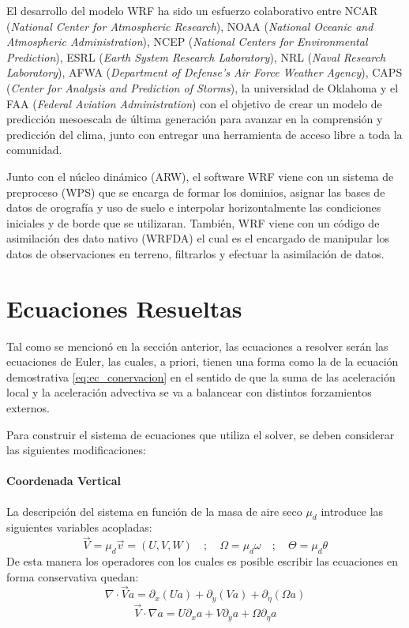 El desarrollo del modelo WRF ha sido un esfuerzo colaborativo entre NCAR (\emph{National Center for Atmospheric Research}), NOAA (\emph{National Oceanic and Atmospheric Administration}), NCEP (\emph{National Centers for Environmental Prediction}), ESRL (\emph{Earth System Research Laboratory}), NRL (\emph{Naval Research Laboratory}), AFWA (\emph{Department of Defense's Air Force Weather Agency}), CAPS (\emph{Center for Analysis and Prediction of Storms}), la universidad de Oklahoma y el FAA (\emph{Federal Aviation Administration}) con el objetivo de crear un modelo de predicción mesoescala de última generación para avanzar en la comprensión y predicción del clima, junto con entregar una herramienta de acceso libre a toda la comunidad.

Junto con el núcleo dinámico (ARW), el software WRF viene con un sistema de preproceso (WPS) que se encarga de formar los dominios, asignar las bases de datos de orografía y uso de suelo e interpolar horizontalmente las condiciones iniciales y de borde que se utilizaran. También, WRF viene con un código de asimilación des dato nativo (WRFDA) el cual es el encargado de manipular los datos de observaciones en terreno, filtrarlos y efectuar la asimilación de datos.
 
\section{Ecuaciones Resueltas}
Tal como se mencionó en la sección anterior, las ecuaciones a resolver serán las ecuaciones de Euler, las cuales, a priori, tienen una forma como la de la ecuación demostrativa \ref{eq:ec_conervacion} en el sentido de que la suma de las aceleración local y la aceleración advectiva se va a balancear con distintos forzamientos externos.

Para construir el sistema de ecuaciones que utiliza el solver, se deben considerar las siguientes modificaciones:
\paragraph{Coordenada Vertical} La descripción del sistema en función de la masa de aire seco $\mu_d$ introduce las siguientes variables acopladas:
\begin{equation}
\vec{V}=\mu_d\vec{v}=(U,V,W)\quad;\quad \Omega = \mu_d \omega \quad;\quad \Theta = \mu_d \theta
\end{equation}
De esta manera los operadores con los cuales es posible escribir las ecuaciones en forma conservativa quedan:
\begin{equation}
\nabla\cdot\vec{V}a = \partial_x(Ua)+\partial_y(Va)+\partial_\eta (\Omega a)
\end{equation}
\begin{equation}
\vec{V}\cdot \nabla a = U\partial_x a + V\partial_y a + \Omega\partial_\eta a
\end{equation}
